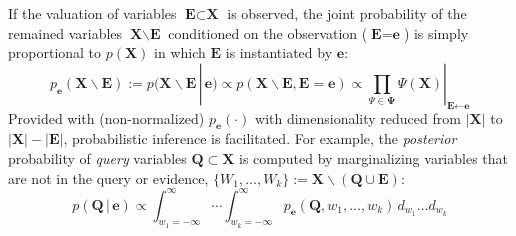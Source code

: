 \documentclass[letterpaper]{article}
\renewcommand{\vec}[1]{\mathbf{#1}}
\newcommand{\bvec}[1]{\textbf{#1}}
\newcommand{\pr}{p}
\begin{document}
If the valuation of variables $\bvec{E} \subset \bvec{X}$ is observed,
the joint probability of the remained variables $\bvec{X} \backslash \bvec{E}$ conditioned on the observation ($\bvec{E} = \bvec{e}$) is simply proportional to $\pr(\bvec{X})$ in which $\bvec{E}$ is instantiated by $\bvec{e}$:
\begin{equation}
\label{e:posterior-joint}
\pr_{\bvec{e}}(\bvec{X} \backslash \bvec{E}) := 
\pr(\bvec{X} \backslash \bvec{E} \,|\, \bvec{e}) \propto 
\pr(\bvec{X} \backslash \bvec{E}, \bvec{E} = \bvec{e}) \propto
\prod_{\Psi \in \boldsymbol\Psi} \Psi (\vec{X})|_{\bvec{E} \leftarrow \bvec{e}}
\end{equation}
Provided with (non-normalized) $\pr_{\bvec{e}}(\cdot)$ with dimensionality reduced from $|\bvec{X}|$ to $|\bvec{X}| - |\bvec{E}|$, probabilistic inference is facilitated. 
For example, 
the \emph{posterior} probability of \emph{query} variables $\vec{Q} \subset \vec{X}$ 
is computed by marginalizing variables that are not in the query or evidence,
$\{W_1, \ldots, W_k\} := \vec{X} \backslash (\vec{Q} \cup \vec{E})$:
\begin{equation}
\label{e:inference}
\pr(\vec{Q} \,|\, \vec{e}) \propto 
\int_{w_1 = -\infty}^{\infty} \!\!\!\!\!\! \cdots \int_{w_k = -\infty}^{\infty}
\!\!\!\!\!\!\!\! \pr_{\bvec{e}}(\bvec{Q}, w_1, \ldots, w_k )
\, d_{w_1} \ldots d_{w_k}
\end{equation}
\end{document}
